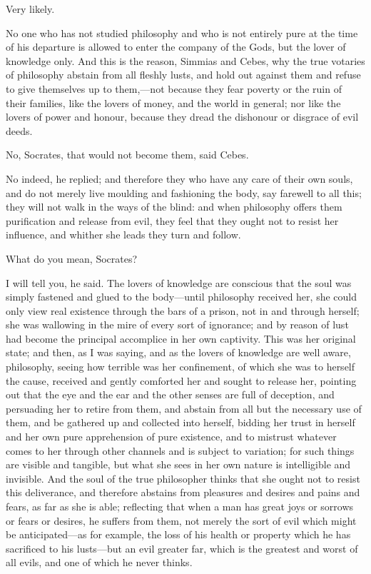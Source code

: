 Very likely.

No one who has not studied philosophy and who is not entirely pure at the
time of his departure is allowed to enter the company of the Gods, but the
lover of knowledge only. And this is the reason, Simmias and Cebes, why
the true votaries of philosophy abstain from all fleshly lusts, and hold
out against them and refuse to give themselves up to them,—not
because they fear poverty or the ruin of their families, like the lovers
of money, and the world in general; nor like the lovers of power and
honour, because they dread the dishonour or disgrace of evil deeds.

No, Socrates, that would not become them, said Cebes.

No indeed, he replied; and therefore they who have any care of their own
souls, and do not merely live moulding and fashioning the body, say
farewell to all this; they will not walk in the ways of the blind: and
when philosophy offers them purification and release from evil, they feel
that they ought not to resist her influence, and whither she leads they
turn and follow.

What do you mean, Socrates?

I will tell you, he said. The lovers of knowledge are conscious that the
soul was simply fastened and glued to the body—until philosophy
received her, she could only view real existence through the bars of a
prison, not in and through herself; she was wallowing in the mire of every
sort of ignorance; and by reason of lust had become the principal
accomplice in her own captivity. This was her original state; and then, as
I was saying, and as the lovers of knowledge are well aware, philosophy,
seeing how terrible was her confinement, of which she was to herself the
cause, received and gently comforted her and sought to release her,
pointing out that the eye and the ear and the other senses are full of
deception, and persuading her to retire from them, and abstain from all
but the necessary use of them, and be gathered up and collected into
herself, bidding her trust in herself and her own pure apprehension of
pure existence, and to mistrust whatever comes to her through other
channels and is subject to variation; for such things are visible and
tangible, but what she sees in her own nature is intelligible and
invisible. And the soul of the true philosopher thinks that she ought not
to resist this deliverance, and therefore abstains from pleasures and
desires and pains and fears, as far as she is able; reflecting that when a
man has great joys or sorrows or fears or desires, he suffers from them,
not merely the sort of evil which might be anticipated—as for
example, the loss of his health or property which he has sacrificed to his
lusts—but an evil greater far, which is the greatest and worst of
all evils, and one of which he never thinks.

